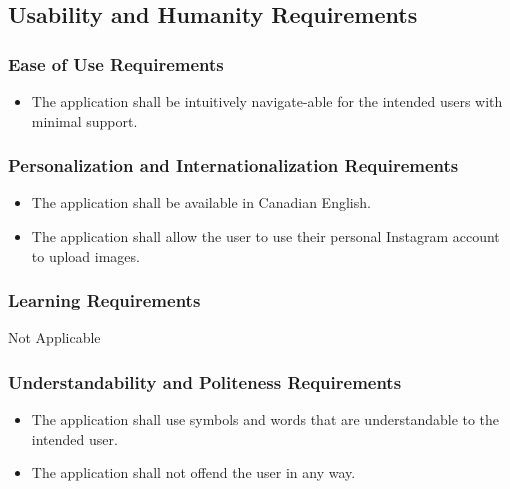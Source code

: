\documentclass[]{article}
\begin{document}

\subsection{Usability and Humanity Requirements}
\label{sub:usability_and_humanity_requirements}

\subsubsection{Ease of Use Requirements}
\label{ssub:ease_of_use_requirements}
\begin{itemize}
	\item The application shall be intuitively navigate-able for the intended users with minimal support. 
\end{itemize}

\subsubsection{Personalization and Internationalization Requirements}
\label{ssub:personalization_and_internationalization_requirements}
\begin{itemize}
	\item The application shall be available in Canadian English.
	\item The application shall allow the user to use their personal Instagram account to upload images. 
\end{itemize}

\subsubsection{Learning Requirements}
\label{ssub:learning_requirements}
Not Applicable

\subsubsection{Understandability and Politeness Requirements}
\label{ssub:understandability_and_politeness_requirements}
\begin{itemize}
	\item The application shall use symbols and words that are understandable to the intended user.
	\item The application shall not offend the user in any way.
\end{itemize}
\end{document}
